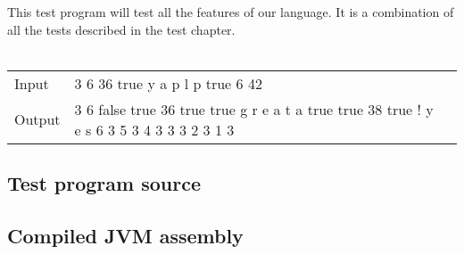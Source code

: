 This test program will test all the features of our language. It is a combination of all the tests described in the test chapter. \\\\
\begin{tabular}{llp{8cm}}
Input 	& 3 6 36 true y a p l p true 6 42 \\
Output 	& 3 6 false true 36 true true g r e a t a true true 38 true ! y e s 6 3 5 3 4 3 3 3 2 3 1 3 \\
\end{tabular}

\begin{landscape}
\section{Test program source}

\end{landscape}

\begin{landscape}
\section{Compiled JVM assembly}

\end{landscape}
